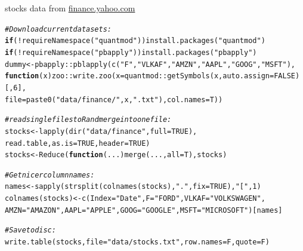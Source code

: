 \documentclass[xcolor=table,      handout ,    xcolor=dvipsnames]{beamer}\usepackage[]{graphicx}\usepackage[]{color}
\makeatletter
\newcommand{\hlnum}[1]{\textcolor[rgb]{0,0,0}{#1}}
\newcommand{\hlstr}[1]{\textcolor[rgb]{0.545,0.137,0.137}{#1}}
\newcommand{\hlcom}[1]{\textcolor[rgb]{0,0.392,0}{\textit{#1}}}
\newcommand{\hlopt}[1]{\textcolor[rgb]{0,0,0}{#1}}
\newcommand{\hlstd}[1]{\textcolor[rgb]{0,0,0}{#1}}
\newcommand{\hlkwa}[1]{\textcolor[rgb]{1,0,0}{\textbf{#1}}}
\newcommand{\hlkwb}[1]{\textcolor[rgb]{0,0,0}{#1}}
\newcommand{\hlkwc}[1]{\textcolor[rgb]{1,0,1}{#1}}
\newcommand{\hlkwd}[1]{\textcolor[rgb]{0,0,1}{#1}}
\newenvironment{kframe}{%
 \def\at@end@of@kframe{}%
 \ifinner\ifhmode%
  \def\at@end@of@kframe{\end{minipage}}%
  \begin{minipage}{\columnwidth}%
 \fi\fi%
 \def\FrameCommand##1{\hskip\@totalleftmargin \hskip-\fboxsep
 \colorbox{shadecolor}{##1}\hskip-\fboxsep
     \hskip-\linewidth \hskip-\@totalleftmargin \hskip\columnwidth}%
 \MakeFramed {\advance\hsize-\width
   \@totalleftmargin\z@ \linewidth\hsize
   \@setminipage}}%
 {\par\unskip\endMakeFramed%
 \at@end@of@kframe}
\newenvironment{knitrout}{}{} %
\makeatother
\begin{document}
\begin{frame}[fragile]{stocks data from \href{http://finance.yahoo.com}{finance.yahoo.com}}
\begin{knitrout}\scriptsize
{}\color{fgcolor}\begin{kframe}
\begin{alltt}
\hlcom{# Download current datasets:}
\hlkwa{if}\hlstd{(}\hlopt{!}\hlkwd{requireNamespace}\hlstd{(}\hlstr{"quantmod"}\hlstd{))} \hlkwd{install.packages}\hlstd{(}\hlstr{"quantmod"}\hlstd{)}
\hlkwa{if}\hlstd{(}\hlopt{!}\hlkwd{requireNamespace}\hlstd{(}\hlstr{"pbapply"}\hlstd{))}  \hlkwd{install.packages}\hlstd{(}\hlstr{"pbapply"}\hlstd{)}
\hlstd{dummy} \hlkwb{<-} \hlstd{pbapply}\hlopt{::}\hlkwd{pblapply}\hlstd{(}\hlkwd{c}\hlstd{(}\hlstr{"F"}\hlstd{,}\hlstr{"VLKAF"}\hlstd{,} \hlstr{"AMZN"}\hlstd{,}\hlstr{"AAPL"}\hlstd{,}\hlstr{"GOOG"}\hlstd{,}\hlstr{"MSFT"}\hlstd{),}
   \hlkwa{function}\hlstd{(}\hlkwc{x}\hlstd{) zoo}\hlopt{::}\hlkwd{write.zoo}\hlstd{(}\hlkwc{x}\hlstd{=quantmod}\hlopt{::}\hlkwd{getSymbols}\hlstd{(x,} \hlkwc{auto.assign}\hlstd{=}\hlnum{FALSE}\hlstd{)[,}\hlnum{6}\hlstd{],}
                           \hlkwc{file}\hlstd{=}\hlkwd{paste0}\hlstd{(}\hlstr{"data/finance/"}\hlstd{,x,}\hlstr{".txt"}\hlstd{),} \hlkwc{col.names}\hlstd{=T))}

\hlcom{# read single files to R and merge into one file:}
\hlstd{stocks} \hlkwb{<-} \hlkwd{lapply}\hlstd{(}\hlkwd{dir}\hlstd{(}\hlstr{"data/finance"}\hlstd{,} \hlkwc{full}\hlstd{=}\hlnum{TRUE}\hlstd{),}
                  \hlstd{read.table,} \hlkwc{as.is}\hlstd{=}\hlnum{TRUE}\hlstd{,} \hlkwc{header}\hlstd{=}\hlnum{TRUE}\hlstd{)}
\hlstd{stocks} \hlkwb{<-} \hlkwd{Reduce}\hlstd{(}\hlkwa{function}\hlstd{(}\hlkwc{...}\hlstd{)} \hlkwd{merge}\hlstd{(...,} \hlkwc{all}\hlstd{=T), stocks)}

\hlcom{# Get nicer column names:}
\hlstd{names} \hlkwb{<-} \hlkwd{sapply}\hlstd{(}\hlkwd{strsplit}\hlstd{(}\hlkwd{colnames}\hlstd{(stocks),} \hlstr{"."}\hlstd{,} \hlkwc{fix}\hlstd{=}\hlnum{TRUE}\hlstd{),}\hlstr{"["}\hlstd{,} \hlnum{1}\hlstd{)}
\hlkwd{colnames}\hlstd{(stocks)} \hlkwb{<-} \hlkwd{c}\hlstd{(}\hlkwc{Index}\hlstd{=}\hlstr{"Date"}\hlstd{,} \hlkwc{F}\hlstd{=}\hlstr{"FORD"}\hlstd{,} \hlkwc{VLKAF}\hlstd{=}\hlstr{"VOLKSWAGEN"}\hlstd{,}
         \hlkwc{AMZN}\hlstd{=}\hlstr{"AMAZON"}\hlstd{,} \hlkwc{AAPL}\hlstd{=}\hlstr{"APPLE"}\hlstd{,} \hlkwc{GOOG}\hlstd{=}\hlstr{"GOOGLE"}\hlstd{,} \hlkwc{MSFT}\hlstd{=}\hlstr{"MICROSOFT"}\hlstd{)[names]}

\hlcom{# Save to disc:}
\hlkwd{write.table}\hlstd{(stocks,} \hlkwc{file}\hlstd{=}\hlstr{"data/stocks.txt"}\hlstd{,} \hlkwc{row.names}\hlstd{=F,} \hlkwc{quote}\hlstd{=F)}
\end{alltt}
\end{kframe}
\end{knitrout}
\end{frame}
\end{document}
